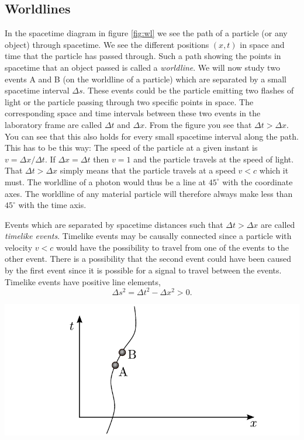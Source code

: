 {\begin{multicols}{2}

\section{Worldlines}
\label{sect:worldlines}

In the spacetime diagram  in figure \ref{fig:wl} we see the path of a particle (or any object) through spacetime. We see the different positions $(x,t)$ in space and time that the particle has passed through. Such a path showing the points in spacetime that an object passed is called a {\it worldline\label{pg:worldline}}. We will now study two events A and B (on the worldline of a particle) which are separated by a small spacetime interval $\Delta s$. These events could be the particle emitting two flashes of light or the particle passing through two specific points in space. The corresponding space and time intervals between these two events in the laboratory frame are called $\Delta t$ and $\Delta x$. From the figure you see that $\Delta t>\Delta x$. You can see that this also holds for every small spacetime interval along the path. This has to be this way: The speed of the particle at a given instant is $v=\Delta x/\Delta t$. If $\Delta x=\Delta t$ then $v=1$ and the particle travels at the speed of light. That $\Delta t>\Delta x$ simply means that the particle travels at a speed $v<c$ which it must. The worldline of a photon would thus be a line at $45^\circ$ with the coordinate axes. The worldline of any material particle will therefore always make less than $45^\circ$ with the time axis.

Events which are separated by spacetime distances such that $\Delta t>\Delta x$ are called {\it timelike events\label{pg:timelike}}. Timelike events may be causally connected since a particle with velocity $v<c$ would have the possibility to travel from one of the events to the other event. There is a possibility that the second event could have been caused by the first event since it is possible for a signal to travel between the events. Timelike events have positive line elements,
\[
\Delta s^2=\Delta t^2-\Delta x^2>0.
\]

\begin{Figure}%
\centering
\includegraphics[width=\textwidth]{fig_9-1.pdf}
\end{Figure}



\end{multicols}}
